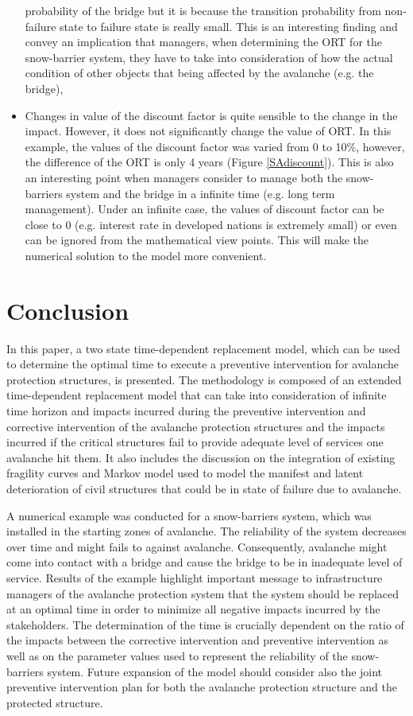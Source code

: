\documentclass[]{article}
\begin{document}
\begin{itemize}
probability of the bridge but it is because the transition probability
from non-failure state to failure state is really small. This is an
interesting finding and convey an implication that managers, when
determining the ORT for the snow-barrier system, they have to take
into consideration of how the actual condition of other objects that
being affected by the avalanche (e.g. the bridge), 
\item Changes in value of the discount factor is quite sensible to the change
in the impact. However, it does not significantly change the value
of ORT. In this example, the values of the discount factor was varied
from 0 to 10\%, however, the difference of the ORT is only 4 years
(Figure \ref{SAdiscount}). This is also an interesting point when
managers consider to manage both the snow-barriers system and the
bridge in a infinite time (e.g. long term management). Under an infinite
case, the values of discount factor can be close to 0 (e.g. interest
rate in developed nations is extremely small) or even can be ignored
from the mathematical view points. This will make the numerical solution
to the model more convenient. 
\end{itemize}

\section{Conclusion}

\label{conclusion} In this paper, a two state time-dependent
replacement model, which can be used to determine the optimal time
to execute a preventive intervention for avalanche protection structures,
is presented. The methodology is composed of an extended time-dependent
replacement model that can take into consideration of infinite time horizon and impacts incurred during the preventive
intervention and corrective intervention of the avalanche protection
structures and the impacts incurred if the critical structures fail
to provide adequate level of services one avalanche hit them. It also
includes the discussion on the integration of existing fragility curves
and Markov model used to model the manifest and latent deterioration
of civil structures that could be in state of failure due to avalanche.

A numerical example was conducted for a snow-barriers system, which
was installed in the starting zones of avalanche. The reliability
of the system decreases over time and might fails to against avalanche.
Consequently, avalanche might come into contact with a bridge and
cause the bridge to be in inadequate level of service. Results of
the example highlight important message to infrastructure managers
of the avalanche protection system that the system should be replaced
at an optimal time in order to minimize all negative impacts incurred
by the stakeholders. The determination of the time is crucially dependent
on the ratio of the impacts between the corrective intervention and
preventive intervention as well as on the parameter values used to
represent the reliability of the snow-barriers system. Future expansion of the model should consider also the joint preventive intervention plan for both the avalanche protection structure and the protected structure.




\end{document}
